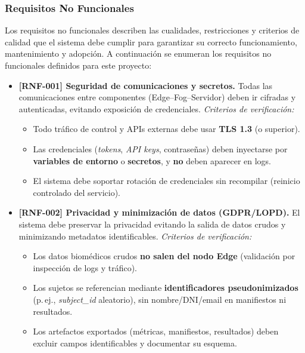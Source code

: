 \documentclass{report}
\begin{document}
\subsubsection{Requisitos No Funcionales}
\label{RequisitosNofuncionales}
Los requisitos no funcionales describen las cualidades, restricciones y criterios de calidad que el sistema debe cumplir para garantizar su correcto funcionamiento, mantenimiento y adopción. A continuación se enumeran los requisitos no funcionales definidos para este proyecto:
\begin{itemize}

  \item \textbf{[RNF-001] Seguridad de comunicaciones y secretos.}  
  Todas las comunicaciones entre componentes (Edge--Fog--Servidor) deben ir cifradas y autenticadas, evitando exposición de credenciales.
  \textit{Criterios de verificación:}
  \begin{itemize}
    \item Todo tráfico de control y APIs externas debe usar \textbf{TLS 1.3} (o superior).
    \item Las credenciales (\textit{tokens}, \textit{API keys}, contraseñas) deben inyectarse por \textbf{variables de entorno} o \textbf{secretos}, y \textbf{no} deben aparecer en logs.
    \item El sistema debe soportar rotación de credenciales sin recompilar (reinicio controlado del servicio).
  \end{itemize}

  \item \textbf{[RNF-002] Privacidad y minimización de datos (GDPR/LOPD).}  
  El sistema debe preservar la privacidad evitando la salida de datos crudos y minimizando metadatos identificables.
  \textit{Criterios de verificación:}
  \begin{itemize}
    \item Los datos biomédicos crudos \textbf{no salen del nodo Edge} (validación por inspección de logs y tráfico).
    \item Los sujetos se referencian mediante \textbf{identificadores pseudonimizados} (p.\,ej., \textit{subject\_id} aleatorio), sin nombre/DNI/email en manifiestos ni resultados.
    \item Los artefactos exportados (métricas, manifiestos, resultados) deben excluir campos identificables y documentar su esquema.
  \end{itemize}


\end{itemize}
\end{document}
